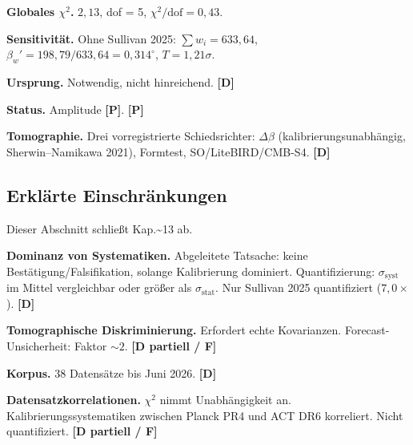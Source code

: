 ﻿\documentclass[11pt,letterpaper]{article}
\begin{document}
\begin{table}[htbp]
  \centering
  \small
\end{table}

\textbf{Globales $\chi^2$.} $2{,}13$, dof = 5, $\chi^2/\mathrm{dof} = 0{,}43$.

\textbf{Sensitivität.} Ohne Sullivan 2025: $\sum w_i = 633{,}64$, $\beta_w' = 198{,}79/633{,}64 = 0{,}314^\circ$, $T = 1{,}21\sigma$.

\textbf{Ursprung.} Notwendig, nicht hinreichend. \textbf{[D]}

\textbf{Status.} Amplitude \textbf{[P]}. \textbf{[P]}

\textbf{Tomographie.} Drei vorregistrierte Schiedsrichter: $\Delta\beta$ (kalibrierungsunabhängig, Sherwin--Namikawa 2021), Formtest, SO/LiteBIRD/CMB-S4. \textbf{[D]}
\subsection{Erklärte Einschränkungen}
Dieser Abschnitt schließt Kap.\textasciitilde{}13 ab.

\textbf{Dominanz von Systematiken.} Abgeleitete Tatsache: keine Bestätigung/Falsifikation, solange Kalibrierung dominiert. Quantifizierung: $\sigma_{\text{syst}}$ im Mittel vergleichbar oder größer als $\sigma_{\text{stat}}$. Nur Sullivan 2025 quantifiziert ($7{,}0\times$). \textbf{[D]}

\textbf{Tomographische Diskriminierung.} Erfordert echte Kovarianzen. Forecast-Unsicherheit: Faktor $\sim 2$. \textbf{[D partiell / F]}

\textbf{Korpus.} 38 Datensätze bis Juni 2026. \textbf{[D]}

\textbf{Datensatzkorrelationen.} $\chi^2$ nimmt Unabhängigkeit an. Kalibrierungssystematiken zwischen Planck PR4 und ACT DR6 korreliert. Nicht quantifiziert. \textbf{[D partiell / F]}
\end{document}
